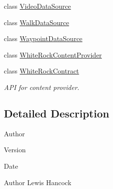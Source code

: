 \begin{DoxyCompactItemize}
class \hyperlink{classuk_1_1ac_1_1swan_1_1digitaltrails_1_1database_1_1_video_data_source}{Video\+Data\+Source}
\item 
class \hyperlink{classuk_1_1ac_1_1swan_1_1digitaltrails_1_1database_1_1_walk_data_source}{Walk\+Data\+Source}
\item 
class \hyperlink{classuk_1_1ac_1_1swan_1_1digitaltrails_1_1database_1_1_waypoint_data_source}{Waypoint\+Data\+Source}
\item 
class \hyperlink{classuk_1_1ac_1_1swan_1_1digitaltrails_1_1database_1_1_white_rock_content_provider}{White\+Rock\+Content\+Provider}
\item 
class \hyperlink{classuk_1_1ac_1_1swan_1_1digitaltrails_1_1database_1_1_white_rock_contract}{White\+Rock\+Contract}
\begin{DoxyCompactList}\small\item\em A\+P\+I for content provider. \end{DoxyCompactList}\end{DoxyCompactItemize}


\subsection{Detailed Description}
\begin{DoxyAuthor}{Author}

\end{DoxyAuthor}
\begin{DoxyVersion}{Version}

\end{DoxyVersion}
\begin{DoxyDate}{Date}

\end{DoxyDate}
\begin{DoxyAuthor}{Author}
Lewis Hancock 
\end{DoxyAuthor}
